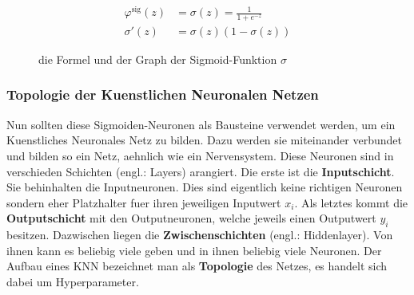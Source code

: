 \documentclass[../main]{subfiles}
\begin{document}
\begin{figure}[h!]
  \begin{minipage}[h!]{0.5\textwidth}
    \begin{align*}
      \varphi^{\text{sig}}(z) &= \sigma(z) = \frac{1}{1 + e^{-z}}\\
      \sigma'(z)&=\sigma(z)(1-\sigma(z))
    \end{align*}
  \end{minipage}
  \begin{minipage}[h!]{0.5\textwidth}
    \centering
  \end{minipage}

  \caption{die Formel und der Graph der Sigmoid-Funktion $\sigma$}
  \label{fig:sigmoid}
\end{figure}




\subsubsection{Topologie der Kuenstlichen Neuronalen Netzen}
Nun sollten diese Sigmoiden-Neuronen als Bausteine verwendet werden, um ein Kuenstliches
Neuronales Netz zu bilden. Dazu werden sie miteinander verbundet und bilden so ein Netz,
aehnlich wie ein Nervensystem.
Diese Neuronen sind in verschieden Schichten (engl.: Layers)
arangiert. Die erste ist die \textbf{Inputschicht}. Sie behinhalten die
Inputneuronen. Dies sind eigentlich keine richtigen
Neuronen sondern eher Platzhalter fuer ihren jeweiligen Inputwert $x_i$. Als letztes kommt die
\textbf{Outputschicht} mit den Outputneuronen, welche jeweils einen Outputwert $y_i$
besitzen. Dazwischen liegen die \textbf{Zwischenschichten} (engl.: Hiddenlayer). Von ihnen kann es
beliebig viele geben und in ihnen beliebig viele Neuronen.
Der Aufbau eines KNN bezeichnet man als \textbf{Topologie} des Netzes, es
handelt sich dabei um Hyperparameter.
\par\medskip
\end{document}
